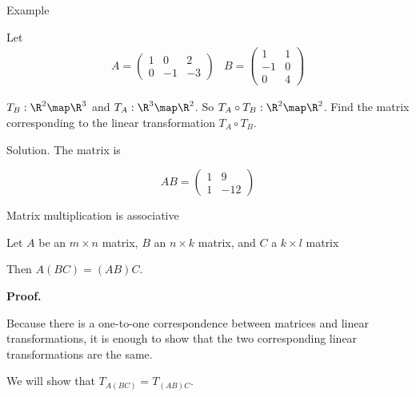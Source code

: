 \documentclass{beamer}
\begin{document}
\begin{frame}{Example}

Let
$$
\begin{matrix}
A=
\begin{pmatrix}
1 &  0 & 2 \\
0 & -1 & -3
\end{pmatrix}
&
B =
\begin{pmatrix}
 1 & 1 \\
-1 & 0 \\
 0 & 4
\end{pmatrix}
\end{matrix}
$$

\pause

$T_B:\R^2\map \R^3$ and $T_A:\R^3\map \R^2$. So $T_A \circ T_B : \R^2\map \R^2$.
Find the matrix corresponding to the linear transformation $T_A \circ T_B$.

\pause

Solution. The matrix is

$$ AB =
\begin{pmatrix}
1 & 9 \\
1 & -12
\end{pmatrix}
$$

\end{frame}


\begin{frame}{Matrix multiplication is associative}

\begin{lemma}
Let $A$ be an $m\times n$ matrix, $B$ an $n\times k$ matrix, and $C$ a $k\times l$ matrix

\pause

Then $A(BC) = (AB)C$.
\end{lemma}

\pause

\textbf{Proof.}

Because there is a one-to-one correspondence between matrices and linear transformations,
it is enough to show that the two corresponding linear transformations are the same.

\pause

\smallskip

We will show that $T_{A(BC)} = T_{(AB)C}$.

\end{frame}

\end{document}
